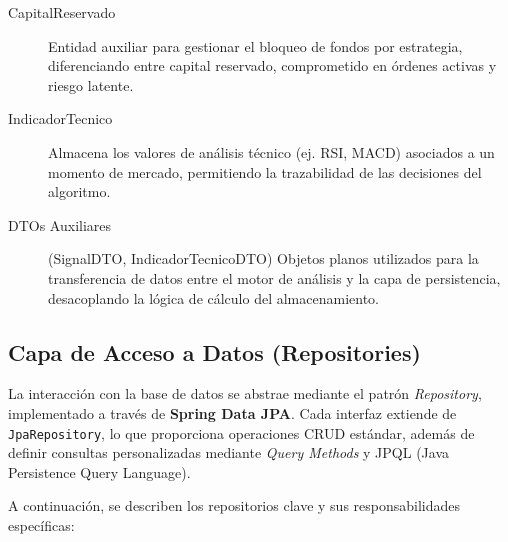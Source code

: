\documentclass[12pt, letterpaper]{article}
\begin{document}
\begin{description}
    \item[CapitalReservado] Entidad auxiliar para gestionar el bloqueo de fondos por estrategia, diferenciando entre capital reservado, comprometido en órdenes activas y riesgo latente.
    
    \item[IndicadorTecnico] Almacena los valores de análisis técnico (ej. RSI, MACD) asociados a un momento de mercado, permitiendo la trazabilidad de las decisiones del algoritmo.
    
    \item[DTOs Auxiliares] (SignalDTO, IndicadorTecnicoDTO) Objetos planos utilizados para la transferencia de datos entre el motor de análisis y la capa de persistencia, desacoplando la lógica de cálculo del almacenamiento.
\end{description}

\subsection{Capa de Acceso a Datos (Repositories)}

La interacción con la base de datos se abstrae mediante el patrón \textit{Repository}, implementado a través de \textbf{Spring Data JPA}. Cada interfaz extiende de \texttt{JpaRepository}, lo que proporciona operaciones CRUD estándar, además de definir consultas personalizadas mediante \textit{Query Methods} y JPQL (Java Persistence Query Language).

A continuación, se describen los repositorios clave y sus responsabilidades específicas:
\end{document}
